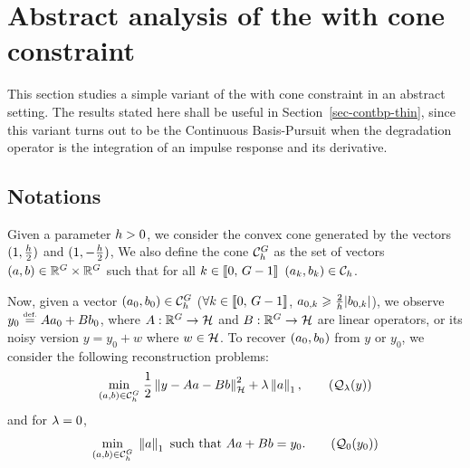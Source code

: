 
\section{Abstract analysis of the \protect\lasso with cone constraint}
\label{sec-continuous-abstract}

This section studies a simple variant of the \lasso with cone constraint in an abstract setting. The results stated here shall be useful in Section~\ref{sec-contbp-thin}, since this variant turns out to be the Continuous Basis-Pursuit when the degradation operator is the integration of an impulse response and its derivative.

\subsection{Notations}

Given a parameter $h>0$, we consider the convex cone generated by the vectors $(1,\frac{h}{2})$ and $(1,-\frac{h}{2})$,
We also define the cone $\mathcal{C}_h^G$ as the set of vectors $(a,b)\in \mathbb{R}^G\times \mathbb{R}^G$ such that for all $k\in\llbracket 0,\,G-1 \rrbracket$ $(a_k,b_k)\in \mathcal{C}_h$.

Now, given a vector $(a_0,b_0)\in \mathcal{C}_h^G$ (\ie  $\forall k\in \llbracket 0,\,G-1 \rrbracket$, $a_{0,k}\geqslant \frac{2}{h}|b_{0,k}|$), we observe $y_0\stackrel{\mbox{\upshape\tiny def.}}{=}{A} a_0 + {B} b_0$, where ${A}: \mathbb{R}^G\rightarrow \mathcal{H}$ and ${B}: \mathbb{R}^G\rightarrow \mathcal{H}$ are linear operators, or its noisy version $y=y_0+w$ where $w\in \mathcal{H}$.
To recover $(a_0,b_0)$ from $y$ or $y_0$, we consider the following reconstruction problems:
\begin{align}
  \umin{(\veccont,\shiftcont)\in \coneh^\taillegrid} \frac{1}{2}\normH{y-\OpU \vecdisc-\OpD\shiftcont}^2 + \la \norm{\veccont}_1, \tag{$\Qq_\la(y)$}\label{eq-abstract-cbpasso}
\end{align}
 and for $\lambda =0$,
\begin{align}
  \umin{(\veccont,\shiftcont)\in \coneh^\taillegrid} \norm{\veccont}_1 \mbox{ such that } \OpU \veccont+ \OpD \shiftcont=y_0.  \tag{$\Qq_0(y_0)$}\label{eq-abstract-cbp}
\end{align}

